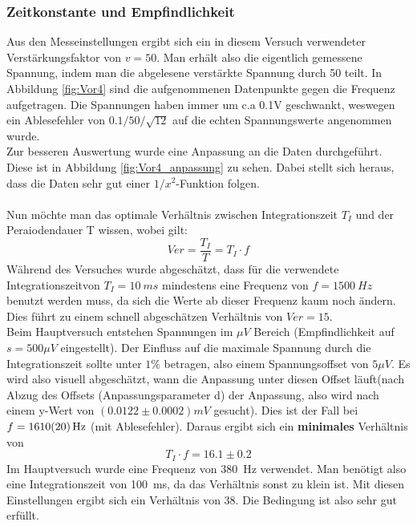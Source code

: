 \documentclass[12pt,a4paper]{article}
\begin{document}
\subsubsection{Zeitkonstante und Empfindlichkeit}
\label{kap.vor4}
Aus den Messeinstellungen ergibt sich ein in diesem Versuch verwendeter Verstärkungsfaktor von $v = 50$. Man erhält also die eigentlich gemessene Spannung, indem man die abgelesene verstärkte Spannung durch 50 teilt. In Abbildung \ref{fig:Vor4} sind die aufgenommenen Datenpunkte gegen die Frequenz aufgetragen. Die Spannungen haben immer um c.a 0.1V geschwankt, weswegen ein Ablesefehler von $0.1/50/\sqrt{12}$ auf die echten Spannungswerte angenommen wurde.\\
Zur besseren Auswertung wurde eine Anpassung an die Daten durchgeführt. Diese ist in Abbildung \ref{fig:Vor4_anpassung} zu sehen. Dabei stellt sich heraus, dass die Daten sehr gut einer $1/x^2$-Funktion folgen.\\
\\
Nun möchte man das optimale Verhältnis zwischen Integrationszeit $T_I$ und der Peraiodendauer T wissen, wobei gilt:
\begin{equation}
Ver = \dfrac{T_I}{T} = T_I \cdot f
\end{equation}
Während des Versuches wurde abgeschätzt, dass für die verwendete Integrationszeitvon $T_I = \SI{10}{ms}$ mindestens eine Frequenz von $f = \SI{1500}{Hz}$ benutzt werden muss, da sich die Werte ab dieser Frequenz kaum noch ändern. Dies führt zu einem schnell abgeschätzen Verhältnis von $Ver = 15$.\\
Beim Hauptversuch entstehen Spannungen im $\si{\mu V}$ Bereich (Empfindlichkeit auf $s = 500\mu V$ eingestellt). Der Einfluss auf die maximale Spannung durch die Integrationszeit sollte unter $1\%$ betragen, also einem Spannungsoffset von $5\mu V$. Es wird also visuell abgeschätzt, wann die Anpassung unter diesen Offset läuft(nach Abzug des Offsets (Anpassungsparameter d) der Anpassung, also wird nach einem y-Wert von $(0.0122\pm 0.0002)mV$ gesucht).  Dies ist der Fall bei $f = \SI{1610\pm 20}{Hz}$ (mit Ablesefehler). Daraus ergibt sich ein \textbf{minimales} Verhältnis von
\begin{equation*}
\boxed{T_I \cdot f = 16.1\pm 0.2}
\end{equation*}
Im Hauptversuch wurde eine Frequenz von \SI{380}{Hz} verwendet. Man benötigt also eine Integrationszeit von \SI{100}{ms}, da das Verhältnis sonst zu klein ist. Mit diesen Einstellungen ergibt sich ein Verhältnis von 
$38$. Die Bedingung ist also sehr gut erfüllt.
\end{document}
